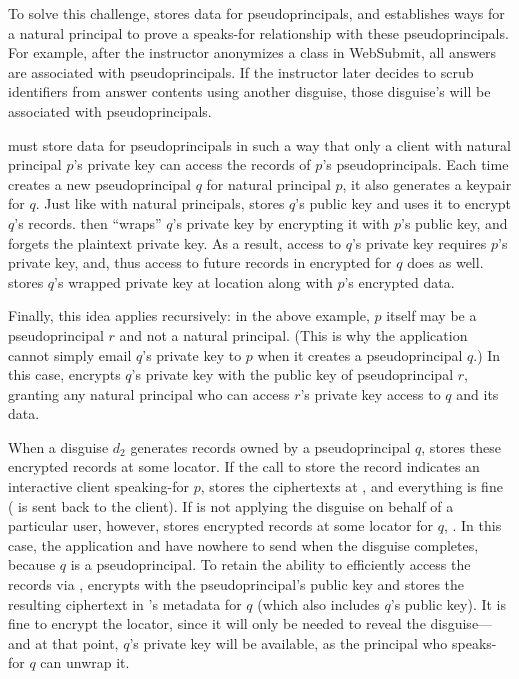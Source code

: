 %
To solve this challenge, \sys stores data for pseudoprincipals,
and establishes ways for a natural principal to prove a speaks-for
relationship with these pseudoprincipals.
%
For example, after the instructor anonymizes a class in WebSubmit, all
answers are associated with pseudoprincipals.
%
If the instructor later decides to scrub identifiers from answer contents
using another disguise, those disguise's will be associated with
pseudoprincipals.
%
%

%
\sys must store data for pseudoprincipals in such a way that only a client
with natural principal $p$'s private key can access the records of $p$'s
pseudoprincipals.
%
%
Each time \sys creates a new pseudoprincipal $q$ for natural principal $p$,
it also generates a keypair for $q$.
%
Just like with natural principals, \sys stores $q$'s public key and uses it
to encrypt $q$'s records.
%
\sys then ``wraps'' $q$'s private key by encrypting it with $p$'s public key,
and forgets the plaintext private key.
%
As a result, access to $q$'s private key requires $p$'s private key, and, thus
access to future records in \sys encrypted for $q$ does as well.
%
\sys stores $q$'s wrapped private key at location  along with
$p$'s encrypted data.
%

%
Finally, this idea applies recursively: in the above example, $p$ itself may
be a pseudoprincipal $r$ and not a natural principal.
%
(This is why the application cannot \eg simply email $q$'s private key to
$p$ when it creates a pseudoprincipal $q$.)
%
In this case, \sys encrypts $q$'s private key with the public key of
pseudoprincipal $r$, granting any natural principal who can access
$r$'s private key access to $q$ and its data.
%

%
When a disguise $d_2$ generates records owned by a pseudoprincipal $q$, \sys
stores these encrypted records at some locator.
%
If the call to store the record indicates an interactive client speaking-for $p$,
\sys stores the ciphertexts at , and everything is fine ( is sent back to the
client).
%
If \sys is not applying the disguise on behalf of a particular user, however, \sys stores encrypted records at some locator for $q$, .
%
In this case, the application and \sys have nowhere to send  when the disguise completes, because $q$ is a
pseudoprincipal.
%
To retain the ability to efficiently access the records via , \sys encrypts 
with the pseudoprincipal's public key and stores the resulting ciphertext in \sys's metadata for $q$
(which also includes $q$'s public key).
%
It is fine to encrypt the locator, since it will only be needed to reveal
the disguise---and at that point, $q$'s private key will be available,
as the principal who speaks-for $q$ can unwrap it.
%

